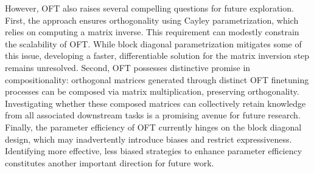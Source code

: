 However, OFT also raises several compelling questions for future exploration. First, the approach ensures orthogonality using Cayley parametrization, which relies on computing a matrix inverse. This requirement can modestly constrain the scalability of OFT. While block diagonal parametrization mitigates some of this issue, developing a faster, differentiable solution for the matrix inversion step remains unresolved. Second, OFT possesses distinctive promise in compositionality: orthogonal matrices generated through distinct OFT finetuning processes can be composed via matrix multiplication, preserving orthogonality. Investigating whether these composed matrices can collectively retain knowledge from all associated downstream tasks is a promising avenue for future research. Finally, the parameter efficiency of OFT currently hinges on the block diagonal design, which may inadvertently introduce biases and restrict expressiveness. Identifying more effective, less biased strategies to enhance parameter efficiency constitutes another important direction for future work.

